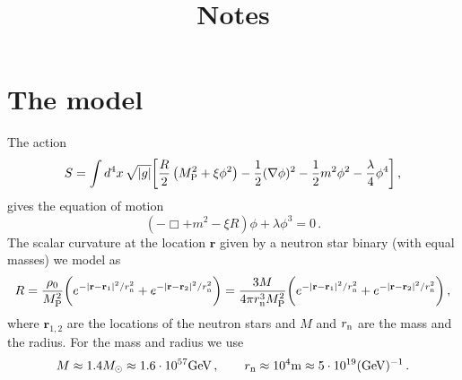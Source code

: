 \documentclass[a4paper,11pt]{article}
\title{Notes}
\newcommand{\ee}[1]{\begin{equation}#1\end{equation}}
\providecommand{\f}[2]{\frac{{#1}}{{#2}}}
\begin{document}
\section{The model}
The action
%
\ee{S=\int d^4x\,\sqrt{|g|}\bigg[\f{R}{2}\left({M_{\rm P}^2}+{\xi}\phi^2\right)-\f{1}{2}(\nabla\phi)^2-\f{1}{2}m^2\phi^2-\f{\lambda}{4}\phi^4\bigg]\,,\label{eq:act}}
gives the equation of motion
\ee{\left(-\Box+m^2-\xi R\right){\phi}+\lambda\phi^3=0\,.} 
The scalar curvature at the location $\mathbf{r}$ given by a neutron star binary (with equal masses) we model as
\ee{R=\f{\rho_0}{M_{\rm P}^2}\bigg(e^{-|\mathbf{r}-\mathbf{r}_1|^2/r_{\rm n}^2}+e^{-|\mathbf{r}-\mathbf{r}_2|^2/r_{\rm n}^2}\bigg)=\f{3 M}{4\pi r_{\rm n}^3M_{\rm P}^2}\bigg(e^{-|\mathbf{r}-\mathbf{r}_1|^2/r_{\rm n}^2}+e^{-|\mathbf{r}-\mathbf{r}_2|^2/r_{\rm n}^2}\bigg)\,,}
where $\mathbf{r}_{1,2}$ are the locations of the neutron stars and $M$ and $r_{\rm n}$ are the mass and the radius. For the mass and radius we use
\ee{M\approx 1.4M_{\odot}\approx 1.6\cdot 10^{57}{\rm GeV}\,,\qquad r_{\rm n}\approx 10^4{\rm m}\approx 5\cdot10^{19}({\rm GeV})^{-1}\,.}
\end{document}
